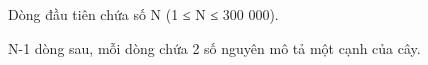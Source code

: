 Dòng đầu tiên chứa số N (1 ≤ N ≤ 300 000).  

   N-1 dòng sau, mỗi dòng chứa 2 số nguyên mô tả một cạnh   của cây.  

\